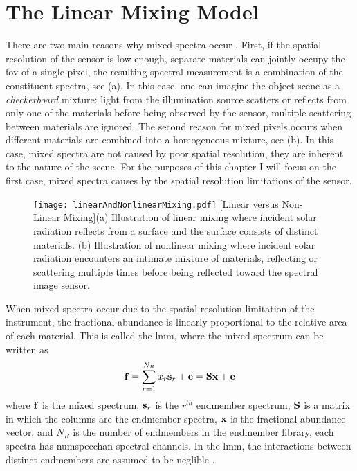 \section{The Linear Mixing Model}

There are two main reasons why mixed spectra occur \cite{keshava2002spectral, keshava2003survey}. First, if the spatial resolution of the sensor is low enough, separate materials can jointly occupy the \acrfull{fov} of a single pixel, the resulting spectral measurement is a combination of the constituent spectra, see (a). In this case, one can imagine the object scene as a \emph{checkerboard} mixture: light from the illumination source scatters or reflects from only one of the materials before being observed by the sensor, multiple scattering between materials are ignored. The second reason for mixed pixels occurs when different materials are combined into a homogeneous mixture, see (b). In this case, mixed spectra are not caused by poor spatial resolution, they are inherent to the nature of the scene. For the purposes of this chapter I will focus on the first case, mixed spectra causes by the spatial resolution limitations of the sensor.

\begin{figure}
	\centering
	\texttt{[image: linearAndNonlinearMixing.pdf]}
	[Linear versus Non-Linear Mixing]{(a) Illustration of linear mixing where incident solar radiation reflects from a surface and the surface consists of distinct materials. (b) Illustration of nonlinear mixing where incident solar radiation encounters an intimate mixture of materials, reflecting or scattering multiple times before being reflected toward the spectral image sensor.}
	\label{fig:linearAndNonlinearMixing}
\end{figure}

When mixed spectra occur due to the spatial resolution limitation of the instrument, the fractional abundance is linearly proportional to the relative area of each material. This is called the \acrfull{lmm}, where the mixed spectrum can be written as 
%
\begin{equation}
\displaystyle \mathbf{f} = \sum_{r=1}^{N_{R}} x_r \displaystyle \mathbf{s}_r + \displaystyle \mathbf{e} = \displaystyle \mathbf{S} \displaystyle \mathbf{x}  + \displaystyle \mathbf{e}
\end{equation}
%
where $\displaystyle \mathbf{f}$ is the \gls{mixed spectrum}, $\displaystyle \mathbf{s}_r$ is the $r^{th}$ endmember spectrum, $\displaystyle \mathbf{S}$ is a matrix in which the columns are the endmember spectra, $\displaystyle \mathbf{x}$ is the fractional abundance vector, and $N_{R}$ is the number of endmembers in the endmember library, each spectra has \gls{numspecchan} spectral channels. In the \gls{lmm}, the interactions between distinct endmembers are assumed to be neglible \cite{clark1984reflectance}. 

